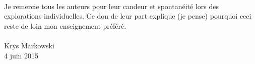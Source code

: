 \documentclass[12pt,twoside]{book}
\begin{document}
\paragraph{} Je remercie tous les auteurs pour leur candeur et spontanéité lors
des explorations individuelles. Ce don de leur part explique (je pense)
pourquoi ceci reste de loin mon enseignement préféré.

\paragraph{} Krys Markowski\\4 juin 2015


\thispagestyle{plain}



\thispagestyle{plain}

\tableofcontents

\mainmatter





\appendix


\end{document}

